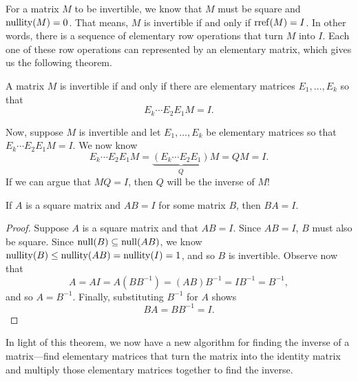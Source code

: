 
For a matrix $M$ to be invertible, we know that $M$ must be square and $\operatorname{nullity}(M)=0$. That means,
$M$ is invertible if and only if $\operatorname{rref}(M)=I$. In other words, there is a sequence of elementary row operations
that turn $M$ into $I$. Each one of these row operations can represented by an elementary matrix, which gives us the
following theorem.

\begin{theorem}
	A matrix $M$ is invertible if and only if there are elementary matrices $E_1,\ldots, E_k$ so that
	\[
		E_k\cdots E_2E_1M=I.
	\]
\end{theorem}

Now, suppose $M$ is invertible and let $E_1,\ldots,E_k$ be elementary matrices so that $E_k\cdots E_2E_1M=I$. We now know
\[
	E_k\cdots E_2E_1M=\underbrace{(E_k\cdots E_2E_1)}_QM=QM=I.
\]
If we can argue that $MQ=I$, then $Q$ will be the inverse of $M$!

\begin{theorem}
	If $A$ is a square matrix and $AB=I$ for some matrix $B$, then
	$BA=I$.
\end{theorem}
\begin{proof}
	Suppose $A$ is a square matrix and that $AB=I$. Since $AB=I$, $B$ must also be square.
	Since $\operatorname{null}(B)\subseteq\operatorname{null}(AB)$, we know $\operatorname{nullity}(B)\leq \operatorname{nullity}(AB)=\operatorname{nullity}(I)=1$, 
	and so $B$ is invertible. Observe now that
	\[
		A=AI=A(BB^{-1})=(AB)B^{-1}=IB^{-1}=B^{-1},
	\]
	and so $A=B^{-1}$. Finally, substituting $B^{-1}$ for $A$ shows
	\[
		BA=BB^{-1}=I.
	\]
\end{proof}

In light of this theorem, we now have a new algorithm for finding the inverse of a matrix---find
elementary matrices that turn the matrix into the identity matrix and multiply those elementary
matrices together to find the inverse.

